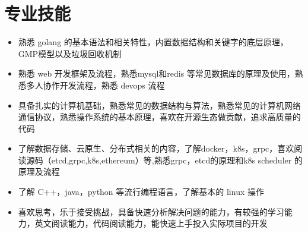 \documentclass[letterpaper,11pt]{ctexart}
\makeatletter
\newcommand{\resumeItem}[1]{
  \item\small{
    {#1 \vspace{-2pt}}
  }
}
\newcommand{\resumeSubheading}[4]{
  \vspace{-2pt}\item
    \begin{tabular*}{1.0\textwidth}[t]{l@{\extracolsep{\fill}}r}
      \textbf{#1} & \textbf{\small #2} \\
      \textit{\small#3} & \textit{\small #4} \\
    \end{tabular*}\vspace{-7pt}
}
\newcommand{\resumeSubHeadingListStart}{\begin{itemize}[leftmargin=0.0in, label={}]}
\newcommand{\resumeSubHeadingListEnd}{\end{itemize}}
\newcommand{\resumeItemListStart}{\begin{itemize}}
\newcommand{\resumeItemListEnd}{\end{itemize}\vspace{-5pt}}
\makeatother
\begin{document}
%
\section{专业技能}
    \resumeItemListStart
    \resumeItem{熟悉 golang 的基本语法和相关特性，内置数据结构和关键字的底层原理，GMP模型以及垃圾回收机制}
    \resumeItem{熟悉 web 开发框架及流程，熟悉mysql和redis 等常见数据库的原理及使用，熟悉多人协作开发流程，熟悉 devops 流程}
    \resumeItem{具备扎实的计算机基础，熟悉常见的数据结构与算法，熟悉常见的计算机网络通信协议，熟悉操作系统的基本原理，喜欢在开源生态做贡献，追求高质量的代码}
    \resumeItem{了解数据存储、云原生、分布式相关的内容，了解docker，k8s，grpc，喜欢阅读源码（etcd,grpc,k8s,ethereum）等,熟悉grpc，etcd的原理和k8s scheduler 的原理及流程}
    \resumeItem{了解 C++，java，python 等流行编程语言，了解基本的 linux 操作}
    \resumeItem{喜欢思考，乐于接受挑战，具备快速分析解决问题的能力，有较强的学习能力，英文阅读能力，代码阅读能力，能快速上手投入实际项目的开发}
    \resumeItemListEnd
 \vspace{-16pt}


%
\end{document}
